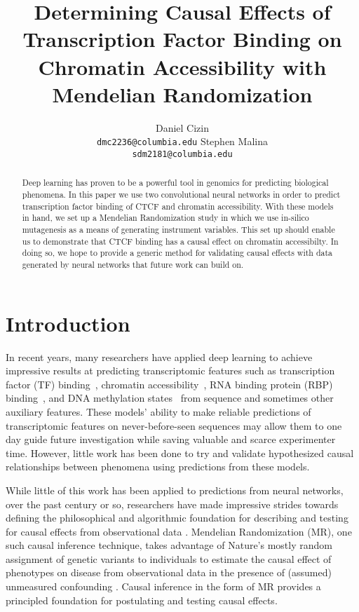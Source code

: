 \documentclass{article}
\title{Determining Causal Effects of Transcription Factor Binding on Chromatin Accessibility with Mendelian Randomization}
\author{%
  Daniel Cizin \\
  \texttt{dmc2236@columbia.edu}
  \And
  Stephen Malina \\
  \texttt{sdm2181@columbia.edu} \\
}
\begin{document}
\maketitle

\begin{abstract}
Deep learning has proven to be a powerful tool in genomics for predicting biological phenomena. In this paper we use two convolutional neural networks in order to predict transcription factor binding of CTCF and chromatin accessibility. With these models in hand, we set up a Mendelian Randomization study in which we use in-silico mutagenesis as a means of generating instrument variables. This set up should enable us to demonstrate that CTCF binding has a causal effect on chromatin accessibilty. In doing so, we hope to provide a generic method for validating causal effects with data generated by neural networks that future work can build on. 
\end{abstract}

\section{Introduction}
In recent years, many researchers have applied deep learning to achieve impressive results at predicting transcriptomic features such as transcription factor (TF) binding~\cite{alipanahi2015predicting, zhou2015predicting}, chromatin accessibility~\cite{kelley2016basset, zhou2015predicting}, RNA binding protein (RBP) binding~\cite{zheng2018deep, zhang2019deepdrbp, koo2018inferring}, and DNA methylation states~\cite{angermueller2017deepcpg} from sequence and sometimes other auxiliary features. These models' ability to make reliable predictions of transcriptomic features on never-before-seen sequences may allow them to one day guide future investigation while saving valuable and scarce experimenter time. However, little work has been done to try and validate hypothesized causal relationships between phenomena using predictions from these models. 

While little of this work has been applied to predictions from neural networks, over the past century or so, researchers have made impressive strides towards defining the philosophical and algorithmic foundation for describing and testing for causal effects from observational data \cite{pearl2000causality}. Mendelian Randomization (MR), one such causal inference technique, takes advantage of Nature's mostly random assignment of genetic variants to individuals to estimate the causal effect of phenotypes on disease from observational data in the presence of (assumed) unmeasured confounding \cite{Didelez2007}. Causal inference in the form of MR provides a principled foundation for postulating and testing causal effects.
\end{document}
